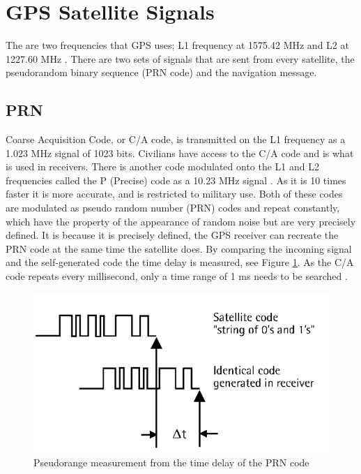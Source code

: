 
\section{GPS Satellite Signals} \label{sec:signals}
The are two frequencies that GPS uses; L1 frequency at 1575.42 MHz and L2 at 1227.60 MHz \cite{signal spec}. There are two sets of signals that are sent from every satellite, the pseudorandom binary sequence (PRN code) and the navigation message.

\subsection{PRN}
Coarse Acquisition Code, or C/A code, is transmitted on the L1 frequency as a 1.023 MHz signal of 1023 bits. Civilians have access to the C/A code and is what is used in receivers. There is another code modulated onto the L1 and L2 frequencies called the P (Precise) code as a 10.23 MHz signal \cite{CA_oxts}. As it is 10 times faster it is more accurate, and is restricted to military use. Both of these codes are modulated as pseudo random number (PRN) codes and repeat constantly, which have the property of the appearance of random noise but are very precisely defined. It is because it is precisely defined, the GPS receiver can recreate the PRN code at the same time the satellite does. By comparing the incoming signal and the self-generated code the time delay is measured, see Figure \ref{fig:PRNtime}. As the C/A code repeats every millisecond, only a time range of 1 ms needs to be searched \cite{trimble_PRN}.


\cite{mit_signals}

\begin{figure}
\centering
\caption{Pseudorange measurement from the time delay of the PRN code \cite{whatwhenhow}}
\label{fig:PRNtime}
\includegraphics[width=0.7\linewidth]{ChapterLiteratureReview/PRNtime.png}
\end{figure}



